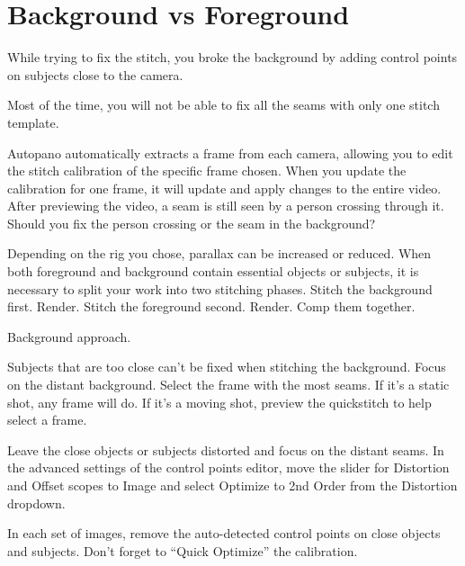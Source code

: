 \chapter{Background vs Foreground}
\pagecolor{white}
\label{chap:34}
\begin{fullwidth}

\problem

{\large While trying to fix the stitch, you broke the background by adding control points on subjects close to the camera. \par}

Most of the time, you will not be able to fix all the seams with only one stitch template. 

Autopano automatically extracts a frame from each camera, allowing you to edit the stitch calibration of the specific frame chosen. When you update the calibration for one frame, it will update and apply changes to the entire video. After previewing the video, a seam is still seen by a person crossing through it. Should you fix the person crossing or the seam in the background?


\clearpage
\solutions

Depending on the rig you chose, parallax can be increased or reduced. When both foreground and background contain essential objects or subjects, it is necessary to split your work into two stitching phases. Stitch the background first. Render. Stitch the foreground second. Render. Comp them together.

{\large Background approach. \par}

Subjects that are too close can’t be fixed when stitching the background. Focus on the distant background. Select the frame with the most seams. If it’s a static shot, any frame will do. If it’s a moving shot, preview the quickstitch to help select a frame. 

Leave the close objects or subjects distorted and focus on the distant seams. In the advanced settings of the control points editor, move the slider for Distortion and Offset scopes to Image and select Optimize to 2nd Order from the Distortion dropdown. 

\clearpage
In each set of images, remove the auto-detected control points on close objects and subjects. Don’t forget to “Quick Optimize” the calibration. 



\end{fullwidth}
